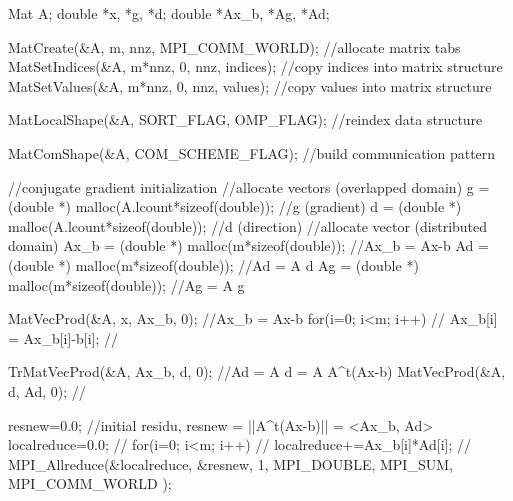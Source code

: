 \begin{DoxyCode}
    Mat A;
    \textcolor{keywordtype}{double} *x, *g, *d;
    \textcolor{keywordtype}{double} *Ax\_b, *Ag, *Ad; 
   
    MatCreate(&A, m, nnz, MPI\_COMM\_WORLD);      \textcolor{comment}{//allocate matrix tabs}
    MatSetIndices(&A, m*nnz, 0, nnz, indices);  \textcolor{comment}{//copy indices into matrix
       structure}
    MatSetValues(&A, m*nnz, 0, nnz, values);    \textcolor{comment}{//copy values into matrix
       structure}
   
    MatLocalShape(&A, SORT\_FLAG, OMP\_FLAG);     \textcolor{comment}{//reindex data structure}
   
    MatComShape(&A, COM\_SCHEME\_FLAG);           \textcolor{comment}{//build communication pattern }
   
    \textcolor{comment}{//conjugate gradient initialization}
    \textcolor{comment}{//allocate vectors (overlapped domain) }
    g  = (\textcolor{keywordtype}{double} *) malloc(A.lcount*\textcolor{keyword}{sizeof}(\textcolor{keywordtype}{double}));      \textcolor{comment}{//g (gradient)}
    d  = (\textcolor{keywordtype}{double} *) malloc(A.lcount*\textcolor{keyword}{sizeof}(\textcolor{keywordtype}{double}));      \textcolor{comment}{//d (direction)  }
    \textcolor{comment}{//allocate vector (distributed domain) }
    Ax\_b = (\textcolor{keywordtype}{double} *) malloc(m*\textcolor{keyword}{sizeof}(\textcolor{keywordtype}{double}));           \textcolor{comment}{//Ax\_b = Ax-b}
    Ad = (\textcolor{keywordtype}{double} *) malloc(m*\textcolor{keyword}{sizeof}(\textcolor{keywordtype}{double}));             \textcolor{comment}{//Ad = A d}
    Ag = (\textcolor{keywordtype}{double} *) malloc(m*\textcolor{keyword}{sizeof}(\textcolor{keywordtype}{double}));             \textcolor{comment}{//Ag = A g}
   
    MatVecProd(&A, x, Ax\_b, 0);           \textcolor{comment}{//Ax\_b = Ax-b}
    \textcolor{keywordflow}{for}(i=0; i<m; i++)                    \textcolor{comment}{// }
      Ax\_b[i] = Ax\_b[i]-b[i];             \textcolor{comment}{//}
   
    TrMatVecProd(&A, Ax\_b, d, 0);         \textcolor{comment}{//Ad = A d =  A A^t(Ax-b)}
    MatVecProd(&A, d, Ad, 0);             \textcolor{comment}{//}
   
    resnew=0.0;                           \textcolor{comment}{//initial residu, resnew =
       ||A^t(Ax-b)|| = <Ax\_b, Ad>}
    localreduce=0.0;                      \textcolor{comment}{//}
    \textcolor{keywordflow}{for}(i=0; i<m; i++)                    \textcolor{comment}{//         }
      localreduce+=Ax\_b[i]*Ad[i];         \textcolor{comment}{//}
    MPI\_Allreduce(&localreduce, &resnew, 1, MPI\_DOUBLE, MPI\_SUM, MPI\_COMM\_WORLD
      );
   

\end{DoxyCode}
